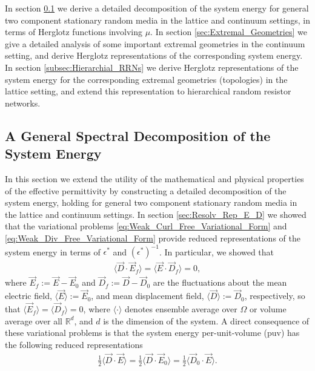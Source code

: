 \documentclass[english,12pt]{ttuthes}
\begin{document}
In section \ref{subsec:Spec_Decomp_Energy} we derive a detailed
decomposition of the system energy for general two component
stationary random media in the lattice and continuum settings, in terms
of Herglotz functions involving $\mu$. In section
\ref{sec:Extremal_Geometries} we give a detailed analysis of some important
extremal geometries in the continuum setting, and derive Herglotz
representations of the corresponding system energy. In section
\ref{subsec:Hierarchial_RRNs} we derive Herglotz representations of
the system energy for the corresponding extremal geometries
(topologies) in the lattice setting, and extend this representation to
hierarchical random resistor networks. 
%
\subsection{A General Spectral Decomposition of the System Energy}
\label{subsec:Spec_Decomp_Energy}
%
In this section we extend the utility of the mathematical and physical
properties of the effective permittivity by constructing a detailed
decomposition of the system energy, holding for general two component
stationary random media in the lattice and continuum settings. In
section \ref{sec:Resolv_Rep_E_D} we showed that the variational 
problems \eqref{eq:Weak_Curl_Free_Variational_Form} and
\eqref{eq:Weak_Div_Free_Variational_Form} provide reduced
representations of the system energy in terms of $\epsilon^*$ and
$(\epsilon^*)^{-1}$. In particular, we showed that
%
\begin{align}\label{eq:Energy_Constraint_E_D}
  \langle\vec{D}\cdot\vec{E}_f\rangle=\langle\vec{E}\cdot\vec{D}_f\rangle=0,
\end{align}
%
where $\vec{E}_f:=\vec{E}-\vec{E}_0$ and
$\vec{D}_f:=\vec{D}-\vec{D}_0$ are the fluctuations about the mean
electric field, $\langle\vec{E}\rangle:=\vec{E}_0$, and mean displacement field, 
$\langle\vec{D}\rangle:=\vec{D}_0$, respectively, so that $\langle\vec{E}_f\rangle=\langle\vec{D}_f\rangle=0$, where
$\langle\cdot\rangle$ denotes ensemble average over $\Omega$ or volume average over all
$\mathbb{R}^d$, and $d$ is the dimension of the system. A direct
consequence of these variational problems is that the system energy
per-unit-volume (puv) has the following reduced representations
\cite{Jackson-1999}  
%
\begin{align}\label{eq:Reduced_Energy_E_D}
  \frac{1}{2}\langle\vec{D}\cdot\vec{E}\rangle=\frac{1}{2}\langle\vec{D}\cdot\vec{E}_0\rangle
  =\frac{1}{2}\langle\vec{D}_0\cdot\vec{E}\rangle.
\end{align}
%
\end{document}

